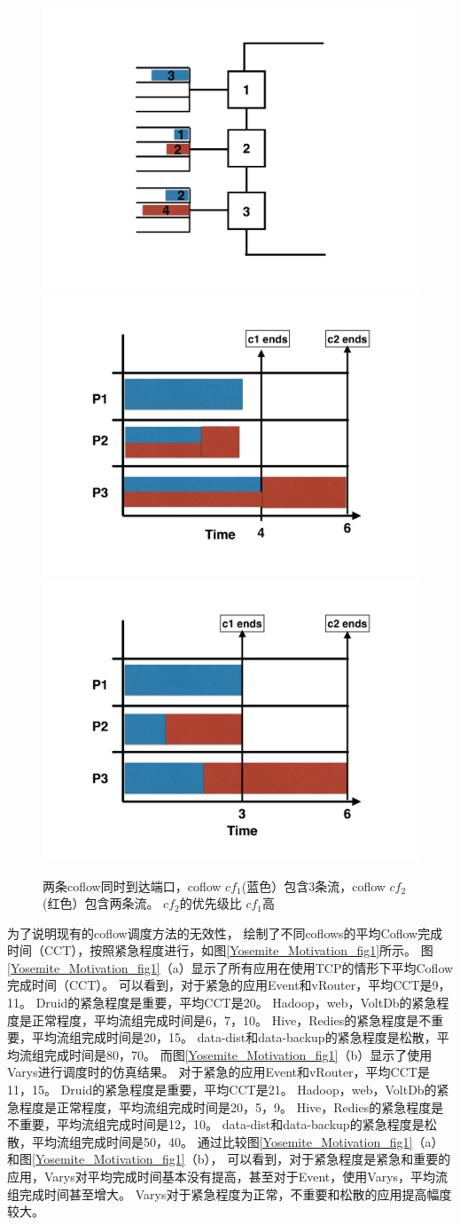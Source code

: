 \begin{figure}[h]
\centering
{}
 {\includegraphics[width=0.32\columnwidth]{figures/Yosemite/figs/motivation/motivation_color_5.pdf}}
{\includegraphics[width=0.32\columnwidth]{figures/Yosemite/figs/motivation/motivation_color_7.pdf}}
{\includegraphics[width=0.32\columnwidth]{figures/Yosemite/figs/motivation/motivation_color_6.pdf}}
\caption{两条coflow同时到达端口，coflow $cf_1$(蓝色）包含3条流，coflow $cf_2$(红色）包含两条流。 $cf_2$的优先级比 $cf_1$高}
\label{Yosemite_Motivation_fig2}
\end{figure}

为了说明现有的coflow调度方法的无效性，
绘制了不同coflows的平均Coflow完成时间（CCT），按照紧急程度进行，如图\ref{Yosemite_Motivation_fig1}所示。
图\ref{Yosemite_Motivation_fig1}（a）显示了所有应用在使用TCP的情形下平均Coflow完成时间（CCT）。
可以看到，对于紧急的应用Event和vRouter，平均CCT是9，11。
Druid的紧急程度是重要，平均CCT是20。
Hadoop，web，VoltDb的紧急程度是正常程度，平均流组完成时间是6，7，10。
Hive，Redies的紧急程度是不重要，平均流组完成时间是20，15。
data-dist和data-backup的紧急程度是松散，平均流组完成时间是80，70。
而图\ref{Yosemite_Motivation_fig1}（b）显示了使用Varys进行调度时的仿真结果。
对于紧急的应用Event和vRouter，平均CCT是11，15。
Druid的紧急程度是重要，平均CCT是21。
Hadoop，web，VoltDb的紧急程度是正常程度，平均流组完成时间是20，5，9。
Hive，Redies的紧急程度是不重要，平均流组完成时间是12，10。
data-dist和data-backup的紧急程度是松散，平均流组完成时间是50，40。
通过比较图\ref{Yosemite_Motivation_fig1}（a）和图\ref{Yosemite_Motivation_fig1}（b），
可以看到，对于紧急程度是紧急和重要的应用，Varys对平均完成时间基本没有提高，甚至对于Event，使用Varys，平均流组完成时间甚至增大。
Varys对于紧急程度为正常，不重要和松散的应用提高幅度较大。

